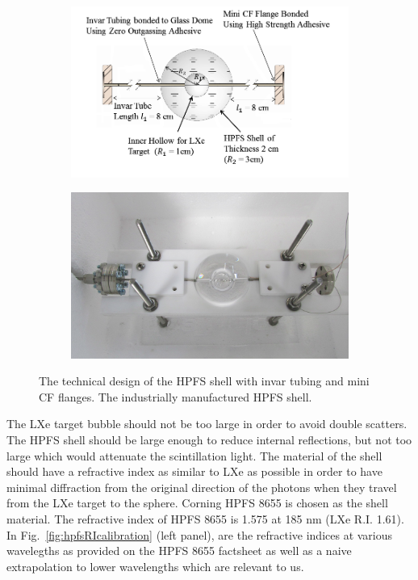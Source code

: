\begin{figure}[h]
\centering
\begin{subfigure}[c]{0.4\textheight}
\includegraphics[width=\textwidth]{spheredesign1.png}
\end{subfigure}
\begin{subfigure}[c]{0.25\textheight}
\includegraphics[width=\textwidth]{spherephoto.png}
\end{subfigure}
\caption{ The technical design of the HPFS shell with invar tubing and mini CF flanges. 
 The industrially manufactured HPFS shell.} 
\label{fig:sphere}
\end{figure}



The LXe target bubble should not be too large in order to avoid double scatters. 
The HPFS shell should be large enough to reduce internal reflections, but not 
too large which would attenuate the scintillation light. The material of the 
shell should have a refractive index as similar to LXe as possible in order to 
have minimal diffraction from the original direction of the photons when they 
travel from the LXe target to the sphere. Corning HPFS 8655 is chosen as the shell 
material. The refractive index of HPFS 8655 is 1.575 at 185 nm (LXe R.I. 1.61). 
In Fig.~\ref{fig:hpfsRIcalibration} (left panel), are the refractive indices at various wavelegths 
as provided on the HPFS 8655 factsheet as well as a naive extrapolation to lower wavelengths 
which are relevant to us. 

